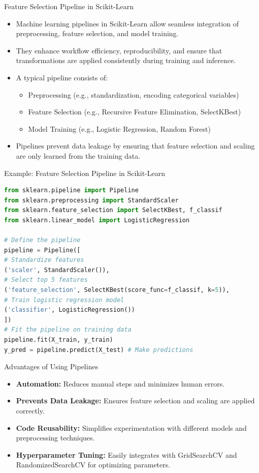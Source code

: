 \documentclass[11pt]{beamer}
\begin{document}
\begin{frame}{Feature Selection Pipeline in Scikit-Learn}
    \begin{itemize}
        \item Machine learning pipelines in Scikit-Learn allow seamless integration of preprocessing, feature selection, and model training.
        \item They enhance workflow efficiency, reproducibility, and ensure that transformations are applied consistently during training and inference.
        \item A typical pipeline consists of:
        \begin{itemize}
            \item Preprocessing (e.g., standardization, encoding categorical variables)
            \item Feature Selection (e.g., Recursive Feature Elimination, SelectKBest)
            \item Model Training (e.g., Logistic Regression, Random Forest)
        \end{itemize}
        \item Pipelines prevent data leakage by ensuring that feature selection and scaling are only learned from the training data.
    \end{itemize}
\end{frame}
%
%
\begin{frame}[fragile]{Example: Feature Selection Pipeline in Scikit-Learn}
\footnotesize{
    \begin{lstlisting}[language=Python]
from sklearn.pipeline import Pipeline
from sklearn.preprocessing import StandardScaler
from sklearn.feature_selection import SelectKBest, f_classif
from sklearn.linear_model import LogisticRegression

# Define the pipeline
pipeline = Pipeline([
# Standardize features
('scaler', StandardScaler()),  
# Select top 5 features
('feature_selection', SelectKBest(score_func=f_classif, k=5)), 
# Train logistic regression model 
('classifier', LogisticRegression()) 
])
# Fit the pipeline on training data
pipeline.fit(X_train, y_train)    
y_pred = pipeline.predict(X_test) # Make predictions
    \end{lstlisting}
}
\end{frame}
%
%
\begin{frame}{Advantages of Using Pipelines}
    \begin{itemize}
        \item \textbf{Automation:} Reduces manual steps and minimizes human errors.
        \item \textbf{Prevents Data Leakage:} Ensures feature selection and scaling are applied correctly.
        \item \textbf{Code Reusability:} Simplifies experimentation with different models and preprocessing techniques.
        \item \textbf{Hyperparameter Tuning:} Easily integrates with GridSearchCV and RandomizedSearchCV for optimizing parameters.
    \end{itemize}
\end{frame}
\end{document}

